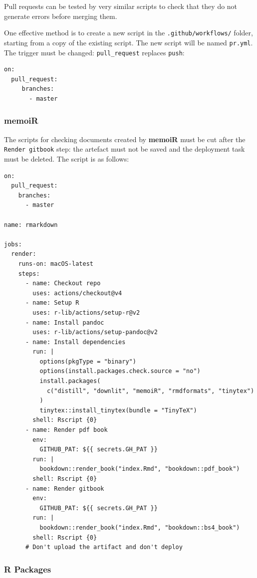 \documentclass[
  12pt,
  american,
  a4paper,
  extrafontsizes,onecolumn,openright
  ]{memoir}
\begin{document}
Pull requests can be tested by very similar scripts to check that they do not generate errors before merging them.

One effective method is to create a new script in the \texttt{.github/workflows/} folder, starting from a copy of the existing script.
The new script will be named \texttt{pr.yml}.
The trigger must be changed: \texttt{pull\_request} replaces \texttt{push}:

\begin{verbatim}
on:
  pull_request:
     branches:
       - master
\end{verbatim}

\subsubsection{memoiR}\label{sec:memoiR-pr-ci}

The scripts for checking documents created by \textbf{memoiR} must be cut after the \texttt{Render\ gitbook} step: the artefact must not be saved and the deployment task must be deleted.
The script is as follows:

\begin{verbatim}
on:
  pull_request:
    branches:
      - master

name: rmarkdown

jobs:
  render:
    runs-on: macOS-latest
    steps:
      - name: Checkout repo
        uses: actions/checkout@v4
      - name: Setup R
        uses: r-lib/actions/setup-r@v2
      - name: Install pandoc
        uses: r-lib/actions/setup-pandoc@v2
      - name: Install dependencies
        run: |
          options(pkgType = "binary")
          options(install.packages.check.source = "no")
          install.packages(
            c("distill", "downlit", "memoiR", "rmdformats", "tinytex")
          )
          tinytex::install_tinytex(bundle = "TinyTeX")
        shell: Rscript {0}
      - name: Render pdf book
        env:
          GITHUB_PAT: ${{ secrets.GH_PAT }}
        run: |
          bookdown::render_book("index.Rmd", "bookdown::pdf_book")
        shell: Rscript {0}
      - name: Render gitbook
        env:
          GITHUB_PAT: ${{ secrets.GH_PAT }}
        run: |
          bookdown::render_book("index.Rmd", "bookdown::bs4_book")
        shell: Rscript {0}
      # Don't upload the artifact and don't deploy
\end{verbatim}

\subsubsection{R Packages}\label{sec:package-pr-ci6}
\end{document}
